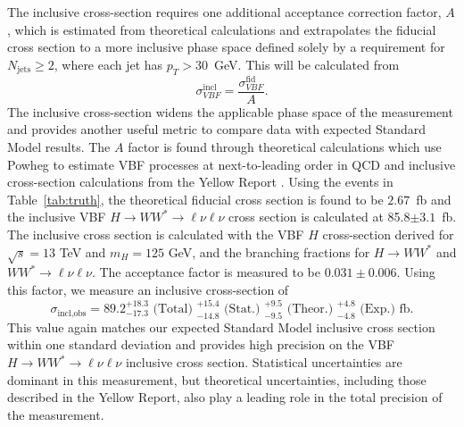 The inclusive cross-section requires one additional acceptance correction factor, $A$, which is estimated from theoretical calculations and extrapolates the fiducial cross section to a more inclusive phase space defined solely by a requirement for $N_{\text{jets}}\geq2$, where each jet has $p_T>30$~GeV. This will be calculated from
\begin{equation}
\sigma_{VBF}^{\text{incl}} = \frac{\sigma_{VBF}^{\text{fid}}}{A}.
\end{equation}
The inclusive cross-section widens the applicable phase space of the measurement and provides another useful metric to compare data with expected Standard Model results. The $A$ factor is found through theoretical calculations which use Powheg to estimate VBF processes at next-to-leading order in QCD and inclusive cross-section calculations from the Yellow Report \cite{LHCCrossSectionWG}. Using the events in Table~\ref{tab:truth}, the theoretical fiducial cross section is found to be $2.67$~fb and the inclusive VBF $H\rightarrow WW^*\rightarrow \ell\nu\ell\nu$ cross section is calculated at 85.8$\pm 3.1$~fb. The inclusive cross section is calculated with the VBF $H$ cross-section derived for $\sqrt{s}=13$ TeV and $m_H=125$ GeV, and the branching fractions for $H\rightarrow WW^*$ and $WW^*\rightarrow\ell\nu\ell\nu$.  The acceptance factor is measured to be $0.031 \pm 0.006$. Using this factor, we measure an inclusive cross-section of
\begin{equation}
\sigma_{\text{incl,obs}} = 89.2^{+18.3}_{-17.3} \text{ (Total) } ^{+15.4}_{-14.8} \text{ (Stat.) } ^{+9.5}_{-9.5} \text{ (Theor.) } ^{+4.8}_{-4.8} \text{ (Exp.)} \text{ fb}.
\end{equation} 
This value again matches our expected Standard Model inclusive cross section within one standard deviation and provides high precision on the VBF $H\rightarrow WW^*\rightarrow\ell\nu\ell\nu$ inclusive cross section. Statistical uncertainties are dominant in this measurement, but theoretical uncertainties, including those described in the Yellow Report, also play a leading role in the total precision of the measurement.   
